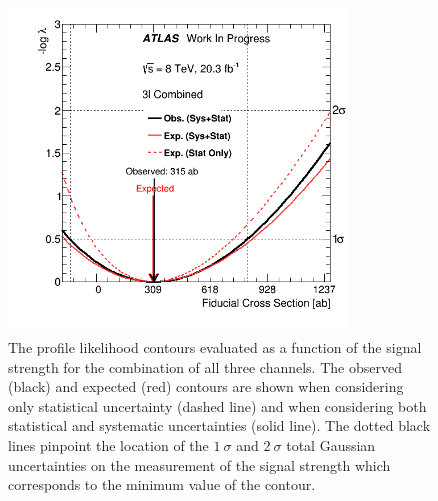 
\begin{figure}[ht!]
\centering
\includegraphics[width=0.8\textwidth]{figures/statistics/measurement/interval/combination.png}
\caption{The profile likelihood contours evaluated as a function of 
the signal strength
for the combination of all three channels. 
The observed (black) and expected (red) contours are shown when 
considering only statistical uncertainty (dashed line) and when considering both statistical and systematic uncertainties (solid line).
The dotted black
lines pinpoint the location of the $1~\sigma$ and $2~\sigma$ total 
Gaussian uncertainties
on the measurement of the signal strength which corresponds to the 
minimum value of the contour.}
\label{fig:stat_measurement_interval_combination}
\end{figure}


